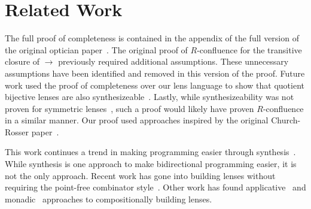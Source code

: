 \documentclass{easychair}
\begin{document}
\section{Related Work}

The full proof of completeness is contained in the appendix of the full version
of the original optician paper~\cite{extended-version}. The original proof of
$R$-confluence for the transitive closure of $\rightarrow$ previously required
additional assumptions. These unnecessary assumptions have been identified and
removed in this version of the proof. Future work used the proof of completeness
over our lens language to show that quotient bijective lenses are also
synthesizeable~\cite{maina+:quotient-synthesis}. Lastly, while synthesizeability
was not proven for symmetric lenses~\cite{soptician}, such a proof would likely
have proven $R$-confluence in a similar manner. Our proof used approaches
inspired by the original Church-Rosser paper~\cite{Church1936SomePO}.

This work continues a trend in making programming easier through
synthesis~\cite{gulwani2017program}. While synthesis is one approach to make
bidirectional programming easier, it is not the only approach. Recent work has
gone into building lenses without requiring the point-free combinator
style~\cite{10.1007/978-3-319-89884-1_2}. Other work has found
applicative~\cite{10.1145/2858949.2784750} and
monadic~\cite{10.1007/978-3-030-17184-1_6} approaches to compositionally
building lenses.



\label{sect:bib}

%
%
%




\end{document}
